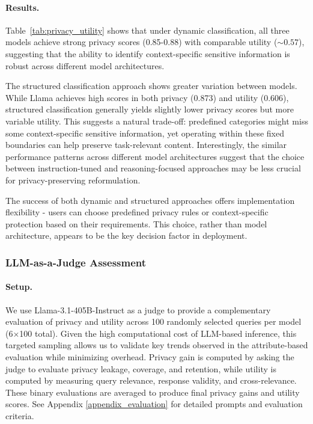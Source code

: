 \paragraph{Results.} Table~\ref{tab:privacy_utility} shows that under dynamic classification, all three models achieve strong privacy scores (0.85-0.88) with comparable utility ($\sim0.57$), suggesting that the ability to identify context-specific sensitive information is robust across different model architectures.

The structured classification approach shows greater variation between models. While Llama achieves high scores in both privacy (0.873) and utility (0.606), structured classification generally yields slightly lower privacy scores but more variable utility. This suggests a natural trade-off: predefined categories might miss some context-specific sensitive information, yet operating within these fixed boundaries can help preserve task-relevant content. Interestingly, the similar performance patterns across different model architectures suggest that the choice between instruction-tuned and reasoning-focused approaches may be less crucial for privacy-preserving reformulation.

The success of both dynamic and structured approaches offers implementation flexibility - users can choose predefined privacy rules or context-specific protection based on their requirements. This choice, rather than model architecture, appears to be the key decision factor in deployment.


\subsubsection{LLM-as-a-Judge Assessment} 
\paragraph{Setup.}  We use Llama-3.1-405B-Instruct as a judge to provide a complementary evaluation of privacy and utility across 100 randomly selected queries per model (6×100 total). Given the high computational cost of LLM-based inference, this targeted sampling allows us to validate key trends observed in the attribute-based evaluation while minimizing overhead. 
Privacy gain is computed by asking the judge to evaluate privacy leakage, coverage, and retention, while utility 
is computed by measuring
query relevance, response validity, and cross-relevance. 
These binary evaluations are averaged to produce final privacy gains and utility scores. See Appendix \ref{appendix_evaluation} for detailed prompts and evaluation criteria.

